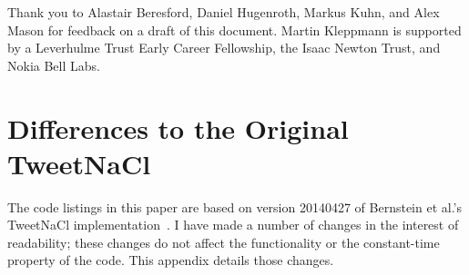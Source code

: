 \documentclass[manuscript]{acmart}
\begin{document}




\begin{acks}
Thank you to Alastair Beresford, Daniel Hugenroth, Markus Kuhn, and Alex Mason for feedback on a draft of this document.
Martin Kleppmann is supported by a Leverhulme Trust Early Career Fellowship, the Isaac Newton Trust, and Nokia Bell Labs.
\end{acks}




\appendix
\section{Differences to the Original TweetNaCl}\label{sec:appendix}

The code listings in this paper are based on version 20140427 of Bernstein et al.'s TweetNaCl implementation~\cite{TweetNaCl}.
I have made a number of changes in the interest of readability; these changes do not affect the functionality or the constant-time property of the code.
This appendix details those changes.
\end{document}

